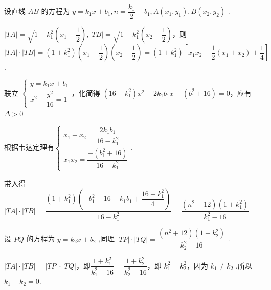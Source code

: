 \begin{enumerate}
\begin{jieda}
\begin{enumerate}
            设直线 $AB$ 的方程为 $y = k_1x+b_1, n = \dfrac{k_1}{2}+b_1, A(x_1,y_1) ,B(x_2,y_2)$ .

            $|TA| = \sqrt{1 + k_1^2}\left( x_1 - \dfrac{1}{2}\right) ,|TB| = \sqrt{1 + k_1^2}\left( x_2 - \dfrac{1}{2}\right)$，则 $|TA| \cdot |TB| = (1 + k_1^2) \left( x_1 - \dfrac{1}{2}\right) \left( x_2 - \dfrac{1}{2}\right) = (1+k_1^2)\left[x_1x_2-\dfrac{1}{2}\left(x_1+x_2\right)+\dfrac{1}{4}\right]$.

            联立 $\left\{ \begin{array}{l} y = k_1x+b_1 \\  x^2 - \dfrac{y^2}{16} = 1 \end{array}\right.$，化简得 $(16 - k_1^2) x^2 - 2k_1b_1x - (b_1^2+16)= 0$，应有$\Delta > 0$

            根据韦达定理有$\left\{ \begin{array}{l}
                x_1 + x_2 = \dfrac{2k_1b_1}{16-k_1^2} \\
                x_{1}x_2 = \dfrac{-(b_1^2+16)}{16-k_1^2}
            \end{array} \right.$.

            带入得$|TA| \cdot |TB| = \dfrac{(1+k_1^2)\left(-b_1^2-16-k_1b_1+\dfrac{16-k_1^2}{4}\right)}{16-k_1^2} = \dfrac{(n^2 + 12) (1 + k_1^2)}{k_1^2 - 16}$

            设 $PQ$ 的方程为 $y = k_2x+b_2$ ,同理 $|TP| \cdot |TQ| = \dfrac{(n^2 + 12) (1 + k_2^2)}{k_2^2 - 16}$ .

            $|TA| \cdot |TB| = |TP| \cdot |TQ|$，即$\dfrac{1 + k_1^2}{k_1^2 - 16} = \dfrac{1 + k_2^2}{k_2^2 - 16}$，即 $k_1^2 = k_2^2$，因为 $k_1 \neq k_2$ ,所以 $k_1 + k_2 = 0$.
        \end{enumerate}
    \end{jieda}


\end{enumerate}

